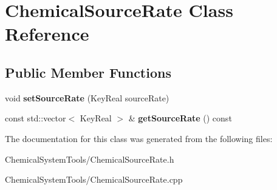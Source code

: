 \hypertarget{classChemicalSourceRate}{
\section{ChemicalSourceRate Class Reference}
\label{classChemicalSourceRate}
}
\subsection*{Public Member Functions}
\begin{DoxyCompactItemize}
\item 
\hypertarget{classChemicalSourceRate_a4ae0590def527e09a4c4ba19562c4ea7}{
void {\bfseries setSourceRate} (KeyReal sourceRate)}
\label{classChemicalSourceRate_a4ae0590def527e09a4c4ba19562c4ea7}

\item 
\hypertarget{classChemicalSourceRate_a53dfd88295b2211a4c40aa8b51691c73}{
const std::vector$<$ KeyReal $>$ \& {\bfseries getSourceRate} () const }
\label{classChemicalSourceRate_a53dfd88295b2211a4c40aa8b51691c73}

\end{DoxyCompactItemize}


The documentation for this class was generated from the following files:\begin{DoxyCompactItemize}
\item 
ChemicalSystemTools/ChemicalSourceRate.h\item 
ChemicalSystemTools/ChemicalSourceRate.cpp\end{DoxyCompactItemize}
